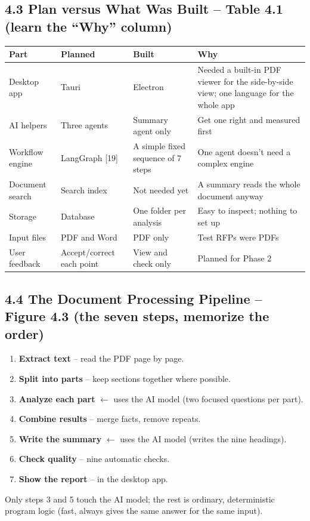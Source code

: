 \documentclass[11pt,a4paper]{article}
\begin{document}
\subsection*{4.3 Plan versus What Was Built -- Table 4.1 (learn the ``Why'' column)}
\begin{center}
\small
\begin{tabular}{@{}p{2.1cm}p{2.0cm}p{2.6cm}p{4.4cm}@{}}
\toprule
\textbf{Part} & \textbf{Planned} & \textbf{Built} & \textbf{Why}\\
\midrule
Desktop app & Tauri & Electron & Needed a built-in PDF viewer for the side-by-side view; one language for the whole app\\
AI helpers & Three agents & Summary agent only & Get one right and measured first\\
Workflow engine & LangGraph [19] & A simple fixed sequence of 7 steps & One agent doesn't need a complex engine\\
Document search & Search index & Not needed yet & A summary reads the whole document anyway\\
Storage & Database & One folder per analysis & Easy to inspect; nothing to set up\\
Input files & PDF and Word & PDF only & Test RFPs were PDFs\\
User feedback & Accept/correct each point & View and check only & Planned for Phase 2\\
\bottomrule
\end{tabular}
\end{center}

\subsection*{4.4 The Document Processing Pipeline -- Figure 4.3 (the seven steps, memorize the order)}
\begin{enumerate}[leftmargin=1.4cm]
  \item \textbf{Extract text} -- read the PDF page by page.
  \item \textbf{Split into parts} -- keep sections together where possible.
  \item \textbf{Analyze each part} $\leftarrow$ uses the AI model (two focused questions per part).
  \item \textbf{Combine results} -- merge facts, remove repeats.
  \item \textbf{Write the summary} $\leftarrow$ uses the AI model (writes the nine headings).
  \item \textbf{Check quality} -- nine automatic checks.
  \item \textbf{Show the report} -- in the desktop app.
\end{enumerate}
Only steps 3 and 5 touch the AI model; the rest is ordinary, deterministic program logic (fast, always
gives the same answer for the same input).
\end{document}
